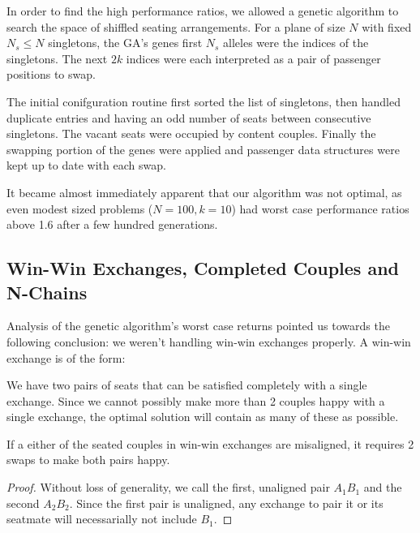 In order to find the high performance ratios, we allowed a genetic algorithm to search the space of shiffled seating arrangements.  For a plane of size $N$ with fixed $N_s \leq N$ singletons, the GA's genes first $N_s$ alleles were the indices of the singletons.  The next $2k$ indices were each interpreted as a pair of passenger positions to swap.  

The initial conifguration routine first sorted the list of singletons, then handled duplicate entries and having an odd number of seats between consecutive singletons. The vacant seats were occupied by content couples.  Finally the swapping portion of the genes were applied and passenger data structures were kept up to date with each swap.

It became almost immediately apparent that our algorithm was not optimal, as even modest sized problems ($N = 100, k = 10$) had worst case performance ratios above 1.6 after a few hundred generations.

\subsection{Win-Win Exchanges, Completed Couples and N-Chains}

Analysis of the genetic algorithm's worst case returns pointed us towards the following conclusion: we weren't handling win-win exchanges properly.  A win-win exchange is of the form:

\begin{figure}[H]
\centering
{}
\end{figure}

We have two pairs of seats that can be satisfied completely with a single exchange. Since we cannot possibly make more than 2 couples happy with a single exchange, the optimal solution will contain as many of these as possible.  

\begin{lem} 
If a either of the seated couples in win-win exchanges are misaligned, it requires 2 swaps to make both pairs happy.
\end{lem}

\begin{proof}
Without loss of generality, we call the first, unaligned pair $A_1B_1$ and the second $A_2B_2$.  Since the first pair is unaligned, any exchange to pair it or its seatmate will necessarially not include $B_1$.  
\end{proof}

